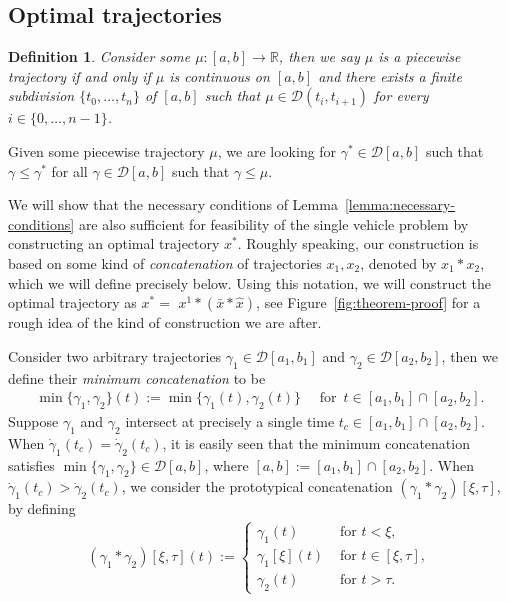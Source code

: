 \documentclass[a4paper]{article}
\theoremstyle{definition}
\theoremstyle{plain}
\newtheorem{define}{Definition\hspace{0.25em}\ignorespaces}
\begin{document}
\newpage

\subsection{Optimal trajectories}

\begin{define}
  Consider some $\mu : [a, b] \rightarrow \mathbb{R}$, then we say $\mu$ is a
  \emph{piecewise trajectory} if and only if $\mu$ is continuous on $[a,b]$ and
  there exists a finite subdivision $\{t_{0}, \dots, t_{n}\}$ of $[a, b]$ such
  that $\mu \in \mathcal{D} (t_{i}, t_{i+1})$ for every
  $i \in \{ 0, \dots, n-1\}$.
\end{define}
%
Given some piecewise trajectory $\mu$, we are looking for
$\gamma^{*} \in \mathcal{D}[a, b]$ such that $\gamma \leq \gamma^{*}$ for all
$\gamma \in \mathcal{D}[a, b]$ such that $\gamma \leq \mu$.

\newpage

We will show that the necessary conditions of
Lemma~\ref{lemma:necessary-conditions} are also sufficient for feasibility of
the single vehicle problem by constructing an optimal trajectory $x^{*}$.
%
Roughly speaking, our construction is based on some kind of \emph{concatenation}
of trajectories $x_{1}, x_{2}$, denoted by $x_{1} * x_{2}$, which we will define
precisely below. Using this notation, we will construct the optimal trajectory
as $x^{*} = $ $x^{1} * (\bar{x} * \hat{x})$, see Figure~\ref{fig:theorem-proof}
for a rough idea of the kind of construction we are after.

Consider two arbitrary trajectories $\gamma_{1} \in \mathcal{D}[a_{1}, b_{1}]$
and $\gamma_{2} \in \mathcal{D}[a_{2}, b_{2}]$, then we define their
\emph{minimum concatenation} to be
\begin{align}
  \min\{ \gamma_{1}, \gamma_{2} \}(t) := \min\{ \gamma_{1}(t), \gamma_{2}(t) \}  \quad \text{ for } \, t \in [a_{1}, b_{1}] \cap [a_{2}, b_{2}] .
\end{align}
%
Suppose $\gamma_{1}$ and $\gamma_{2}$ intersect at precisely a single time
$t_{c} \in [a_{1},b_{1}] \cap [a_{2}, b_{2}]$. When
$\dot{\gamma}_{1}(t_{c}) = \dot{\gamma}_{2}(t_{c})$, it is easily seen that the
minimum concatenation satisfies
$\min\{\gamma_{1}, \gamma_{2} \} \in \mathcal{D}[a, b]$, where
$[a, b] := [a_{1}, b_{1}] \cap [a_{2}, b_{2}]$.
%
When $\dot{\gamma}_{1}(t_{c}) > \dot{\gamma}_{2}(t_{c})$, we consider the
prototypical concatenation $(\gamma_{1} * \gamma_{2})[\xi, \tau]$, by defining
\begin{align}
  (\gamma_{1} * \gamma_{2})[\xi, \tau](t) :=
  \begin{cases}
      \gamma_{1}(t) & \text{ for } t < \xi , \\
      \gamma_{1}[\xi](t) & \text{ for } t \in [\xi, \tau] , \\
      \gamma_{2}(t) & \text{ for } t > \tau .
  \end{cases}
\end{align}
\end{document}
